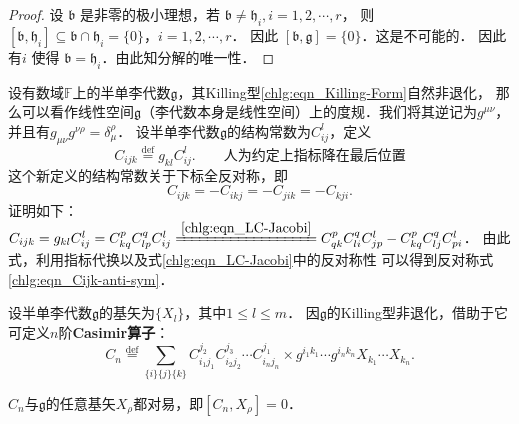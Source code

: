 \begin{proof}
    设 $\mathfrak{b}$ 是非零的极小理想，若 $\mathfrak{b} \neq \mathfrak{h}_i, i=1,2, \cdots, r$，
    则 $\left[\mathfrak{b}, \mathfrak{h}_i\right] \subseteq \mathfrak{b} \cap \mathfrak{h}_i=\{0\}$，$i=1,2, \cdots, r$．
    因此 $[\mathfrak{b}, \mathfrak{g}]=\{0\}$．这是不可能的．
    因此有$i$ 使得 $\mathfrak{b}=\mathfrak{h}_i$．由此知分解的唯一性．
\end{proof}



设有数域$\mathbb{F}$上的半单李代数$\mathfrak{g}$，其Killing型\eqref{chlg:eqn_Killing-Form}自然非退化，
那么可以看作线性空间$\mathfrak{g}$（李代数本身是线性空间）上的度规．我们将其逆记为$g^{\mu\nu}$，
并且有$g_{\mu\nu}g^{\nu\rho}=\delta^\rho_\mu$．
设半单李代数$\mathfrak{g}$的结构常数为$C_{ij}^l$，定义
\begin{equation}
    C_{ijk} \overset{\mathrm {def}}{=} g_{kl} C_{ij}^l .
    \qquad \text{人为约定上指标降在最后位置}
\end{equation}
这个新定义的结构常数关于下标全反对称，即
\begin{equation}\label{chlg:eqn_Cijk-anti-sym}
    C_{ijk} = -C_{ikj} = -C_{jik} = -C_{kji} .
\end{equation}
证明如下：
$    C_{ijk} =  g_{kl} C_{ij}^l = C^p_{kq} C^q_{lp} C_{ij}^l
\xlongequal{\ref{chlg:eqn_LC-Jacobi}}
C^p_{qk} C^q_{li} C_{jp}^l -C^p_{kq} C^q_{lj} C_{pi}^l $．
由此式，利用指标代换以及式\eqref{chlg:eqn_LC-Jacobi}中的反对称性
可以得到反对称式\eqref{chlg:eqn_Cijk-anti-sym}．





设半单李代数$\mathfrak{g}$的基矢为$\{X_l\}$，其中$1\leqslant l \leqslant m$．
因$\mathfrak{g}$的Killing型非退化，借助于它可定义$n$阶{\bfseries \heiti Casimir算子}：
\begin{equation}\label{chlg:eqn_Casimir}
    C_n \overset{\mathrm {def}}{=} \sum_{\{i\}\{j\}\{k\}}
    C_{i_1 j_1} ^{j_2} C_{i_2 j_2} ^{j_3}\cdots C_{i_n j_n} ^{j_1} 
    \times g^{i_1 k_1} \cdots g^{i_n k_n} X_{k_1} \cdots X_{k_n} .
\end{equation}

\begin{theorem}\label{chlg:thm_CX=0}
    $C_n$与$\mathfrak{g}$的任意基矢$X_\rho$都对易，即$[C_n, X_\rho]=0$．
\end{theorem}     

